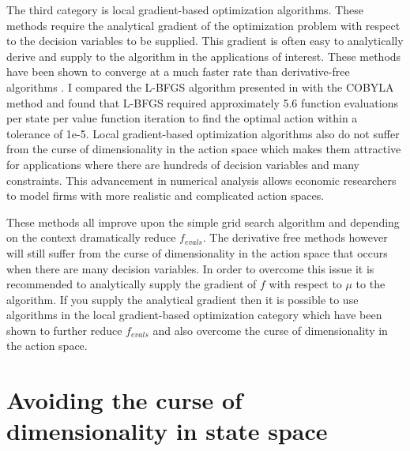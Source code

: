 \documentclass[12pt]{article}
\begin{document}
The third category is local gradient-based optimization algorithms. These methods require the analytical gradient of the optimization problem with respect to the decision variables to be supplied. This gradient is often easy to analytically derive and supply to the algorithm in the applications of interest. These methods have been shown to converge at a much faster rate than derivative-free algorithms \citep{friendly}. I compared the L-BFGS algorithm presented in \cite{bfgs1, bfgs2} with the COBYLA method and found that L-BFGS required approximately 5.6 function evaluations per state per value function iteration to find the optimal action within a tolerance of 1e-5. Local gradient-based optimization algorithms also do not suffer from the curse of dimensionality in the action space which makes them attractive for applications where there are hundreds of decision variables and many constraints. This advancement in numerical analysis allows economic researchers to model firms with  more realistic and complicated action spaces.

These methods all improve upon the simple grid search algorithm and depending on the context dramatically reduce $f_{evals}$. The derivative free methods however will still suffer from the curse of dimensionality in the action space that occurs when there are many decision variables. In order to overcome this issue it is recommended to analytically supply the gradient of $f$ with respect to $\mu$ to the algorithm. If you supply the analytical gradient then it is possible to use algorithms in the local gradient-based optimization category which have been shown to further reduce $f_{evals}$ and also overcome the curse of dimensionality in the action space.

\section{Avoiding the curse of dimensionality in state space}
\label{state}
\end{document}

